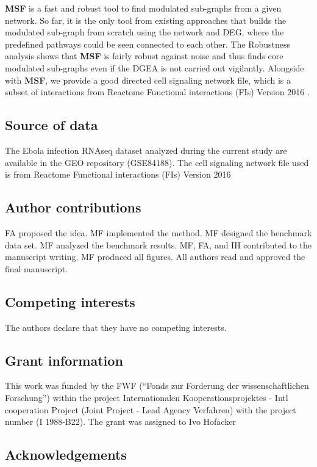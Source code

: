 \documentclass[10pt,a4paper,twocolumn]{article}
\begin{document}
\textbf{MSF} is a fast and robust tool to find modulated sub-graphs
from a given network. So far, it is the only tool from existing
approaches that builds the modulated sub-graph from scratch using the
network and DEG, where the predefined pathways could be seen connected
to each other. The Robustness analysis shows that \textbf{MSF} is
fairly robust against noise and thus finds core modulated sub-graphs
even if the DGEA is not carried out vigilantly. Alongside with
\textbf{MSF}, we provide a good directed cell signaling network file,
which is a subset of interactions from Reactome Functional
interactions (FIs) Version 2016 .

\subsection*{Source of data}

The Ebola infection RNAseq dataset analyzed during the current study
are available in the GEO repository (GSE84188). The cell signaling
network file used is from Reactome Functional interactions (FIs)
Version 2016


\subsection*{Author contributions}
FA proposed the idea. MF implemented the method. MF designed the
benchmark data set. MF analyzed the benchmark results. MF, FA, and IH
contributed to the manuscript writing. MF produced all figures. All
authors read and approved the final manuscript.

\subsection*{Competing interests}

The authors declare that they have no competing interests.


\subsection*{Grant information}

This work was funded by the FWF (“Fonds zur Forderung der
wissenschaftlichen Forschung”) within the project Internationalen
Kooperationsprojektes - Intl cooperation Project (Joint Project - Lead
Agency Verfahren) with the project number (I 1988-B22). The grant was
assigned to Ivo Hofacker


\subsection*{Acknowledgements}
\end{document}
